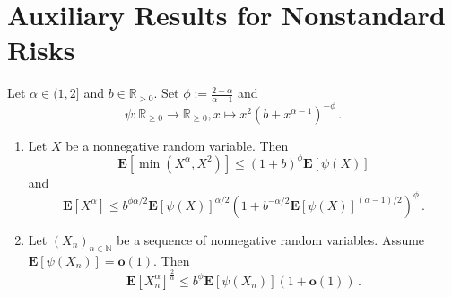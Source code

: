 \documentclass{article}
\newcommand*{\mo}[1]{\mathbf{#1}}
\newcommand{\N}{\mathbb{N}}
\newcommand{\R}{\mathbb{R}}
\newcommand{\Rp}{\R_{\geq0}}
\newcommand{\Rpp}{\R_{>0}}
\newcommand{\lab}{\left[} %
\newcommand{\rab}{\right]} %
\newcommand{\ab}[1]{\lab #1 \rab} %
\newcommand{\abOf}[1]{\!\ab{#1}} %
\newcommand{\lb}{\left(} %
\newcommand{\rb}{\right)} %
\newcommand{\br}[1]{\lb #1 \rb} %
\newcommand{\brOf}[1]{\!\br{#1}} %
\newcommand{\E}{\mathbf{E}} %
\newcommand{\Eof}[1]{\E[#1]}
\newcommand{\EOf}[1]{\E\abOf{#1}}
\newcommand{\eqfs}{\,.}
\begin{document}
\section{Auxiliary Results for Nonstandard Risks}
%
%
\begin{lemma}\label{lmm:loss:toalpha}
    Let $\alpha\in(1,2]$ and $b\in\Rpp$. Set $\phi:=\frac{2-\alpha}{\alpha-1}$ and
    \begin{equation}
        \psi\colon\Rp\to\Rp, x\mapsto x^2(b+x^{\alpha-1})^{-\phi}
        \eqfs
    \end{equation}
    \begin{enumerate}[label=(\roman*)]
        \item
        Let $X$ be a nonnegative random variable. 
        Then
        \begin{equation}
            \EOf{\min\brOf{X^\alpha, X^2}} \leq (1+b)^\phi \EOf{\psi(X)}
        \end{equation}
        and
        \begin{equation}
            \EOf{X^\alpha} \leq b^{\phi\alpha/2} \EOf{\psi(X)}^{\alpha/2} \br{1+b^{-\alpha/2}\EOf{\psi(X)}^{(\alpha-1)/2}}^{\phi}
            \eqfs
        \end{equation}
        \item
        Let $(X_n)_{n\in\N}$ be a sequence of nonnegative random variables.
        Assume $\Eof{\psi(X_n)} = \mo o(1)$.
        Then
        \begin{equation}
            \EOf{X_n^\alpha}^{\frac{2}{\alpha}}
            \leq 
            b^{\phi} \Eof{\psi(X_n)} \br{1+\mo o(1)}
            \eqfs
        \end{equation}
    \end{enumerate}
\end{lemma}
%
\end{document}
